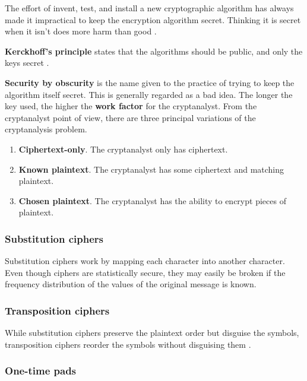 The effort of invent, test, and install a new cryptographic algorithm has always made it impractical to keep the encryption algorithm secret.
Thinking it is secret when it isn't does more harm than good \cite[p.~768]{computer-networks-tanenbaum-2012}.

\textbf{Kerckhoff's principle} states that the algorithms should be public, and only the keys secret \cite[p.~768]{computer-networks-tanenbaum-2012}.

\textbf{Security by obscurity} is the name given to the practice of trying to keep the algorithm itself secret.
This is generally regarded as a bad idea. The longer the key used, the higher the \textbf{work factor} for the cryptanalyst.
From the cryptanalyst point of view, there are three principal variations of the cryptanalysis problem.

\begin{enumerate}
    \item \textbf{Ciphertext-only}. The cryptanalyst only has ciphertext.
    \item \textbf{Known plaintext}. The cryptanalyst has some ciphertext and matching plaintext.
    \item \textbf{Chosen plaintext}. The cryptanalyst has the ability to encrypt pieces of plaintext.
\end{enumerate}

\subsubsection{Substitution ciphers}

Substitution ciphers work by mapping each character into another character.
Even though ciphers are statistically secure, they may easily be broken if the frequency distribution of the values of the original message is known.

\subsubsection{Transposition ciphers}

While substitution ciphers preserve the plaintext order but disguise the symbols, transposition ciphers reorder the symbols without disguising them \cite[p.~771]{computer-networks-tanenbaum-2012}.

\subsubsection{One-time pads}

